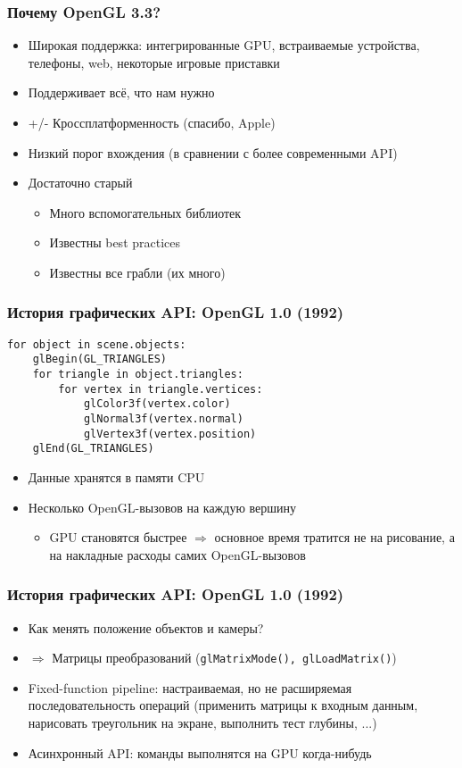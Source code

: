\documentclass{beamer}
\begin{document}
\begin{frame}
\frametitle{Почему OpenGL 3.3?}
\pause
\begin{itemize}
\item Широкая поддержка: интегрированные GPU, встраиваемые устройства, телефоны, web, некоторые игровые приставки
\pause
\item Поддерживает всё, что нам нужно
\pause
\item +/- Кроссплатформенность \pause (спасибо, Apple)
\pause
\item Низкий порог вхождения (в сравнении с более современными API)
\pause
\item Достаточно старый
\begin{itemize}
\item Много вспомогательных библиотек
\item Известны best practices
\item Известны все грабли \pause (их много)
\end{itemize}
\end{itemize}
\end{frame}

\begin{frame}[fragile]
\frametitle{История графических API: OpenGL 1.0 (1992)}
\begin{verbatim}
for object in scene.objects:
    glBegin(GL_TRIANGLES)
    for triangle in object.triangles:
        for vertex in triangle.vertices:
            glColor3f(vertex.color)
            glNormal3f(vertex.normal)
            glVertex3f(vertex.position)
    glEnd(GL_TRIANGLES)
\end{verbatim}
\pause
\begin{itemize}
\item Данные хранятся в памяти CPU
\pause
\item Несколько OpenGL-вызовов на каждую вершину
\pause
\begin{itemize}
\item GPU становятся быстрее $\Longrightarrow$ основное время тратится не на рисование, а на накладные расходы самих OpenGL-вызовов
\end{itemize}
\end{itemize}
\end{frame}

\begin{frame}[fragile]
\frametitle{История графических API: OpenGL 1.0 (1992)}
\begin{itemize}
\item Как менять положение объектов и камеры?
\pause
\item $\Longrightarrow$ Матрицы преобразований (\verb|glMatrixMode(), glLoadMatrix()|)
\pause
\item Fixed-function pipeline: настраиваемая, но не расширяемая последовательность операций (применить матрицы к входным данным, нарисовать треугольник на экране, выполнить тест глубины, ...)
\pause
\item Асинхронный API: команды выполнятся на GPU когда-нибудь
\end{itemize}
\end{frame}
\end{document}
